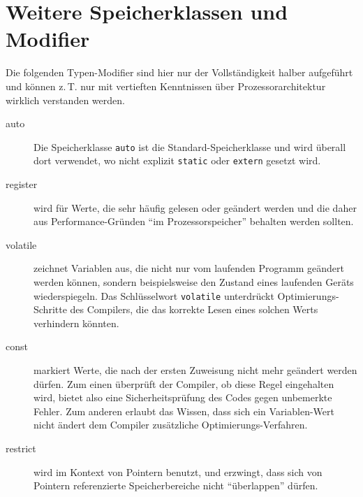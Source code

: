 \section{Weitere Speicherklassen und Modifier}
Die folgenden Typen-Modifier sind hier nur der Vollständigkeit halber aufgeführt und können z.\,T. nur mit vertieften Kenntnissen über Prozessorarchitektur wirklich verstanden werden.
\begin{description}
\item[auto] Die Speicherklasse \texttt{auto} ist die Standard-Speicherklasse und wird überall
	dort verwendet, wo nicht explizit \texttt{static} oder \texttt{extern} gesetzt wird.
\item[register] wird für Werte, die sehr häufig gelesen oder geändert werden und die daher aus
	Performance-Gründen \enquote{im Prozessorspeicher} behalten werden sollten.
\item[volatile] zeichnet Variablen aus, die nicht nur vom laufenden Programm geändert werden können,
	sondern beispielsweise den Zustand eines laufenden Geräts wiederspiegeln. Das Schlüsselwort
	\texttt{volatile} unterdrückt Optimierungs-Schritte des Compilers, die das korrekte Lesen
	eines solchen Werts verhindern könnten.
\item[const] markiert Werte, die nach der ersten Zuweisung nicht mehr geändert werden dürfen. Zum einen
	überprüft der Compiler, ob diese Regel eingehalten wird, bietet also eine Sicherheitsprüfung des
	Codes gegen unbemerkte Fehler. Zum anderen erlaubt das Wissen, dass sich ein Variablen-Wert nicht
	ändert dem Compiler zusätzliche Optimierungs-Verfahren.
\item[restrict] wird im Kontext von Pointern benutzt, und erzwingt, dass sich von Pointern referenzierte
	Speicherbereiche nicht \enquote{überlappen} dürfen.
\end{description}
